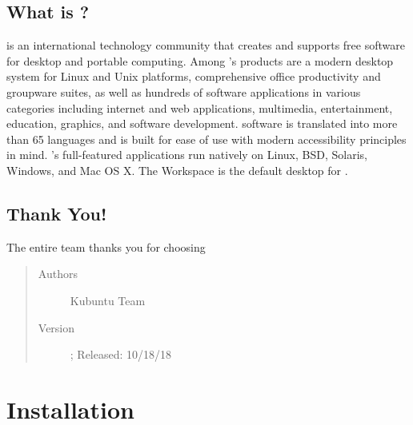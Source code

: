 \documentclass[letterpaper,10pt,english]{sphinxmanual}
\begin{document}
\section{What is ?}
\label{\detokenize{welcome:what-is-kde}}
 is an international technology community that creates and supports free software for desktop and portable computing. Among ’s products are a modern desktop system for Linux and Unix platforms, comprehensive office productivity and groupware suites, as well as hundreds of software applications in various categories including internet and web applications, multimedia, entertainment, education, graphics, and software development.  software is translated into more than 65 languages and is built for ease of use with modern accessibility principles in mind. ’s full-featured applications run natively on Linux, BSD, Solaris, Windows, and Mac OS X. The  Workspace is the default desktop for .


\section{Thank You!}
\label{\detokenize{welcome:thank-you}}
The entire  team thanks you for choosing 
\begin{quote}\begin{description}
\item[{Authors}] \leavevmode
Kubuntu Team

\item[{Version}]  ; Released: 10/18/18

\end{description}\end{quote}


\chapter{Installation}
\label{\detokenize{docs/installation:installation}}\label{\detokenize{docs/installation::doc}}
\end{document}
